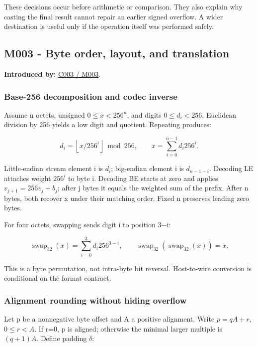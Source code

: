These decisions occur before arithmetic or comparison. They also explain why casting the final result cannot repair an earlier signed overflow. A wider destination is useful only if the operation itself was performed safely.

\subsection{M003 - Byte order, layout, and translation}\label{m003---byte-order-layout-and-translation}

\textbf{Introduced by:} \hyperref[01-foundations-i-ch002]{C003 / M003}.

\subsubsection{Base-256 decomposition and codec inverse}\label{base-256-decomposition-and-codec-inverse}

Assume n octets, unsigned \(0\le x<256^n\), and digits \(0\le d_i<256\). Euclidean division by 256 yields a low digit and quotient. Repeating produces:

\[
d_i=\left\lfloor x/256^i\right\rfloor\bmod256,\qquad
x=\sum_{i=0}^{n-1}d_i256^i.
\]

Little-endian stream element i is \(d_i\); big-endian element i is \(d_{n-1-i}\). Decoding LE attaches weight \(256^i\) to byte i. Decoding BE starts at zero and applies \(v_{j+1}=256v_j+b_j\); after j bytes it equals the weighted sum of the prefix. After n bytes, both recover x under their matching order. Fixed n preserves leading zero bytes.

For four octets, swapping sends digit i to position 3−i:

\[
\operatorname{swap}_{32}(x)=\sum_{i=0}^{3}d_i256^{3-i},\qquad
\operatorname{swap}_{32}(\operatorname{swap}_{32}(x))=x.
\]

This is a byte permutation, not intra-byte bit reversal. Host-to-wire conversion is conditional on the format contract.

\subsubsection{Alignment rounding without hiding overflow}\label{alignment-rounding-without-hiding-overflow}

Let p be a nonnegative byte offset and A a positive alignment. Write \(p=qA+r\), \(0\le r<A\). If r=0, p is aligned; otherwise the minimal larger multiple is \((q+1)A\). Define padding \(\delta\):

